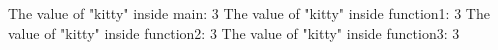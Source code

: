 The value of "kitty" inside main: 3
The value of "kitty" inside function1: 3
The value of "kitty" inside function2: 3
The value of "kitty" inside function3: 3
